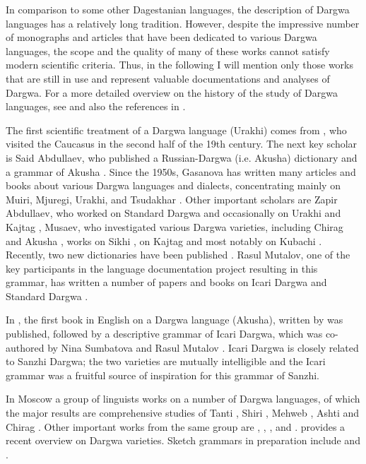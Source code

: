 In comparison to some other Dagestanian languages, the description of Dargwa languages has a relatively long tradition. However, despite the impressive number of monographs and articles that have been dedicated to various Dargwa languages, the scope and the quality of many of these works cannot satisfy modern scientific criteria. Thus, in the following I will mention only those works that are still in use and represent valuable documentations and analyses of Dargwa. For a more detailed overview on the history of the study of Dargwa languages, see \citet{Magometov1983} and also the references in \citet{Temirbulatova2005}.

The first scientific treatment of a Dargwa language (Urakhi) comes from \citet{Uslar1892}, who visited the Caucasus in the second half of the 19th century. The next key scholar is Said Abdullaev, who published a Russian-Dargwa (i.e. Akusha) dictionary and a grammar of Akusha \citep{Abdullaev1950, Abdullaev1954}. Since the 1950s, Gasanova has written many articles and books about various Dargwa languages and dialects, concentrating mainly on Muiri, Mjuregi, Urakhi, and Tsudakhar \citep[e.g.][]{Gasanova1961, Gasanova1971}. Other important scholars are Zapir Abdullaev, who worked on Standard Dargwa and occasionally on Urakhi and Kajtag \citep[e.g.]{Abdullaev1961, Abdullaev1969, Abdullaev1971, Abdullaev1986, Abdullaev1993, AbdullaevEtAl2014}, Musaev, who investigated various Dargwa varieties, including Chirag and Akusha \citep[e.g.][]{Musaev1975, Musaev1978, Musaev1980a, Musaev1980b, Musaev1983, Musaev1984}, works on Sikhi \citep{Kadibagomedov1998}, on Kajtag \citep{Temirbulatova2005} and most notably on Kubachi \citep{Magometov1963}. Recently, two new dictionaries have been published \citep{Jusupov2005, Jusupov2009}. Rasul Mutalov, one of the key participants in the language documentation project resulting in this grammar, has written a number of papers and books on Icari Dargwa and Standard Dargwa \citep{Mutalov1992, Mutalov2002, Mutalov2018}.

In , the first book in English on a Dargwa language (Akusha), written by  was published, followed by a descriptive grammar of Icari Dargwa, which was co-authored by Nina Sumbatova and Rasul Mutalov \citep{Sumbatova.Mutalov2003}. Icari Dargwa is closely related to Sanzhi Dargwa; the two varieties are mutually intelligible and the Icari grammar was a fruitful source of inspiration for this grammar of Sanzhi.

In Moscow a group of linguists works on a number of Dargwa languages, of which the major results are comprehensive studies of Tanti \citep{Sumbatova.Lander2014}, Shiri \citep{BelyaevInPreparation}, Mehweb \citep{DanielMehweb}, Ashti \citep{Belyaev2012} and Chirag \citep{GanenkovChirag}. Other important works from the same group are \citet{Kalinina.Sumbatova2007}, \citet{Sumbatova2009, Sumbatova2010, Sumbatova2011, Sumbatova2013}, \citet{Lander2008, Lander2010}, and \citet{Serdobolskaya2009, Serdobolskaya2010}. \citet{SumbatovaInPreparation} provides a recent overview on Dargwa varieties. Sketch grammars in preparation include \citet{GanenkovChiragSketch} and \citet{ForkerSanzhiSketch}.

